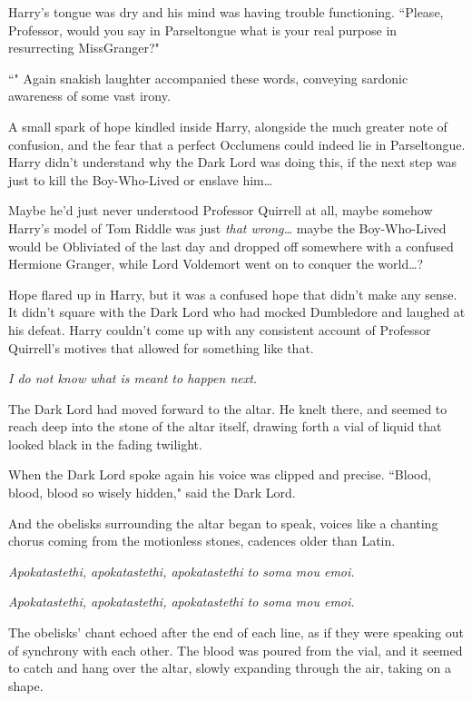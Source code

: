 Harry's tongue was dry and his mind was having trouble functioning. ``Please, Professor, would you say in Parseltongue what is your real purpose in resurrecting Miss\?Granger?"

``" Again snakish laughter accompanied these words, conveying sardonic awareness of some vast irony.

A small spark of hope kindled inside Harry, alongside the much greater note of confusion, and the fear that a perfect Occlumens could indeed lie in Parseltongue. Harry didn't understand why the Dark Lord was doing this, if the next step was just to kill the Boy-Who-Lived or enslave him{\ldots}

Maybe he'd just never understood Professor Quirrell at all, maybe somehow Harry's model of Tom Riddle was just \emph{that wrong{\ldots}} maybe the Boy-Who-Lived would be Obliviated of the last day and dropped off somewhere with a confused Hermione Granger, while Lord Voldemort went on to conquer the world{\ldots}?

Hope flared up in Harry, but it was a confused hope that didn't make any sense. It didn't square with the Dark Lord who had mocked Dumbledore and laughed at his defeat. Harry couldn't come up with any consistent account of Professor Quirrell's motives that allowed for something like that.

\emph{I do not know what is meant to happen next.}

The Dark Lord had moved forward to the altar. He knelt there, and seemed to reach deep into the stone of the altar itself, drawing forth a vial of liquid that looked black in the fading twilight.

When the Dark Lord spoke again his voice was clipped and precise. ``Blood, blood, blood so wisely hidden," said the Dark Lord.

And the obelisks surrounding the altar began to speak, voices like a chanting chorus coming from the motionless stones, cadences older than Latin.

\emph{Apokatastethi, apokatastethi, apokatastethi to soma mou emoi.}

\emph{Apokatastethi, apokatastethi, apokatastethi to soma mou emoi.}

The obelisks' chant echoed after the end of each line, as if they were speaking out of synchrony with each other. The blood was poured from the vial, and it seemed to catch and hang over the altar, slowly expanding through the air, taking on a shape.

